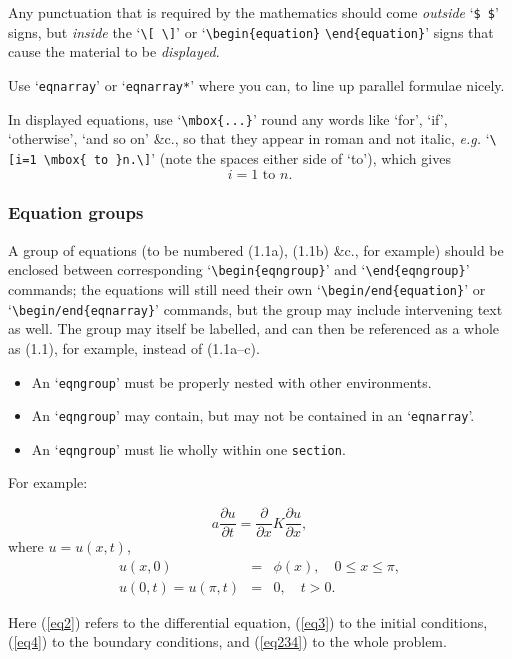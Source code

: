 Any punctuation that is required by the mathematics should come {\em
outside} `\verb!$!~\verb!$!' signs, but {\em inside} the
`\verb!\[!~\verb!\]!' or `\verb!\begin{equation}! \verb!\end{equation}!'
signs that cause the material to be {\em displayed}.
 
Use `\verb!eqnarray!' or `\verb!eqnarray*!' where you can, to line up
parallel formulae nicely.
 
In displayed equations, use `\verb!\mbox{...}!' round any words like `for',
`if', `otherwise', `and so on' \&c., so that they appear in roman and not
italic, {\em e.g.} `\verb!\[i=1 \mbox{ to }n.\]!' (note the spaces either
side of `to'), which gives
\[i=1 \mbox{ to }n.\]
 
\subsubsection{Equation groups}
 
A group of equations (to be numbered (1.1a), (1.1b) \&c., for example)
should be enclosed between corresponding `\verb!\begin{eqngroup}!' and
`\verb!\end{eqngroup}!' commands; the equations will still need their own
`\verb!\begin/end{equation}!' or `\verb!\begin/end{eqnarray}!' commands,
but the group may include intervening text as well.  The group may itself
be labelled, and can then be referenced as a whole as (1.1), for example,
instead of (1.1a--c).
 
\begin{itemize}
\item An `\verb!eqngroup!' must be properly nested with other environments.
 
\item An `\verb!eqngroup!' may contain, but may not be contained in an
`\verb!eqnarray!'.
 
\item An `\verb!eqngroup!' must lie wholly within one \verb!section!.
 
\end{itemize}
 
\noindent For example:
        \begin{eqngroup}\label{eq234}
        \begin{equation}
        a \frac{\partial u}{\partial t} =
        \frac{\partial}{\partial x}
          K \frac{\partial u}{\partial x},
        \label{eq2}\end{equation}
        where $u = u(x,t)$,
        \begin{eqnarray}
        u(x,0) &=& \phi(x),
          \quad 0\leq x\leq \pi,\label{eq3}\\
        u(0,t) = u(\pi,t) &=& 0,
          \quad t>0.\label{eq4}
        \end{eqnarray}
        \end{eqngroup}
        Here (\ref{eq2}) refers to the differential
        equation, (\ref{eq3}) to the initial conditions,
        (\ref{eq4}) to the boundary conditions, and
        (\ref{eq234}) to the whole problem.
 

